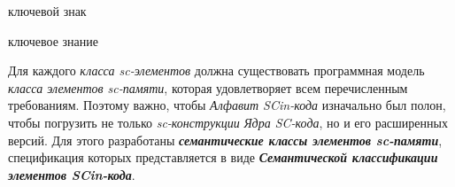 \begin{SCn}
	
\begin{scnrelfromlist}{ключевой знак}
\end{scnrelfromlist}

\begin{scnrelfromlist}{ключевое знание}
\end{scnrelfromlist}	
	
\end{SCn}

Для каждого \textit{класса sc-элементов} должна существовать программная модель \textit{класса элементов sc-памяти\scnsupergroupsign}, которая удовлетворяет всем перечисленным требованиям. Поэтому важно, чтобы \textit{Алфавит SCin-кода} изначально был полон, чтобы погрузить не только \textit{sc-конструкции} \textit{Ядра SC-кода}, но и его расширенных версий. Для этого разработаны \textbf{\textit{семантические классы элементов sc-памяти\scnsupergroupsign}}, спецификация которых представляется в виде \textbf{\textit{Семантической классификации элементов SCin-кода}}.

